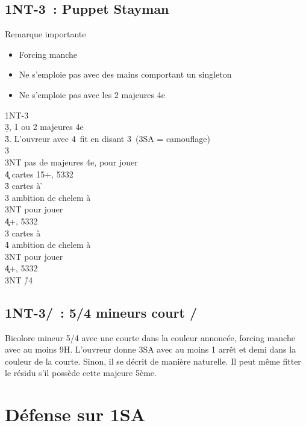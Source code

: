 \documentclass[a4paper]{article}
\begin{document}
\subsection{1NT-3\pdfc\ : Puppet Stayman}

Remarque importante

\begin{itemize}
\item Forcing manche

\item Ne s'emploie pas avec des mains comportant un singleton 

\item Ne s'emploie pas avec les 2 majeures 4e

\end{itemize}

\begin{bidtable}
1NT-3\c\\
3\d {}, 1 ou 2 majeures 4e\+\\
3\h {}\s . L'ouvreur avec 4\s\ fit en disant 3\s\ (3SA = camouflage)\\
3\s {}\h \\
3NT \> pas de majeures 4e, pour jouer\\
4\c\d {} cartes 15+, 5332\-\\
3\h {} cartes à \h \+\\
3\s \> ambition de chelem à \h \\
3NT \> pour jouer\\
4\c\d {}+, 5332\-\\
3\s {} cartes à \s \+\\
4\h \> ambition de chelem à \s \\
3NT \> pour jouer\\
4\c\d {}+, 5332\-\\
3NT \h /4\s 
\end{bidtable}

\subsection{1NT-3\pdfh/\pdfs\ : 5/4 mineurs court \pdfh/\pdfs}

Bicolore mineur 5/4 avec une courte dans la couleur annoncée, forcing manche avec au 
moins 9H. L’ouvreur donne 3SA avec au moins 1 arrêt et demi dans la couleur de la courte.
Sinon, il se décrit de manière naturelle. Il peut même fitter le résidu s’il possède cette majeure 5ème.

\section{Défense sur 1SA}
\end{document}
